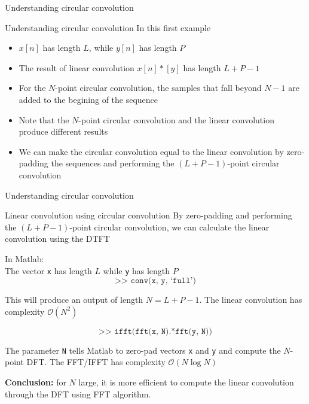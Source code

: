 \documentclass[10pt, handout]{beamer}
\begin{document}
%
\begin{frame}{Understanding circular convolution}
	\begin{center}
		\resizebox{0.65\textwidth}{!}{}
	\end{center}
\end{frame}

\begin{frame}{Understanding circular convolution}
In this first example
\begin{itemize}
	\item $x[n]$ has length $L$, while $y[n]$ has length $P$
	\item The result of linear convolution $x[n]\ast [y]$ has length $L+P-1$
	\item For the $N$-point circular convolution, the {\color{blue2} samples that fall beyond $N-1$} are added to the begining of the sequence
	\item Note that the $N$-point circular convolution and the linear convolution produce different results
	\item We can make the circular convolution equal to the linear convolution by zero-padding the sequences and performing the $(L+P-1)$-point circular convolution
\end{itemize}
\end{frame}

%
\begin{frame}{Understanding circular convolution}
\begin{center}
	\resizebox{0.65\textwidth}{!}{}
\end{center}
\end{frame}

\begin{frame}{Linear convolution using circular convolution}
By zero-padding and performing the $(L+P-1)$-point circular convolution, we can calculate the linear convolution using the DTFT

\vspace{0.25cm}
In Matlab:\\
The vector \texttt{x} has length $L$ while \texttt{y} has length $P$
\begin{equation*}
	\texttt{>> conv(x, y, `full')} \tag{linear convolution}
\end{equation*}

This will produce an output of length $N = L+P-1$. The linear convolution has complexity $\mathcal{O}(N^2)$

\begin{equation*}
\texttt{>> ifft(fft(x, N).*fft(y, N))} \tag{circular convolution}
\end{equation*}

The parameter \texttt{N} tells Matlab to zero-pad vectors \texttt{x} and \texttt{y}  and compute the $N$-point DFT. The FFT/IFFT has complexity $\mathcal{O}(N\log N)$

\vspace{0.25cm}
\textbf{Conclusion:} for $N$ large, it is more efficient to compute the linear convolution through the DFT using FFT algorithm.
\end{frame}
\end{document}
